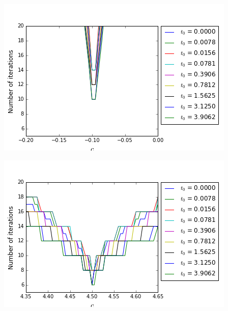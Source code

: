 \begin{minipage}{.5\linewidth}
\begin{center}
	\includegraphics[scale=.4]{figures/FinalFigures/NiterxCoefVarT0FinalVersionNDetail2.png}
\end{center}
\end{minipage}
\begin{minipage}{.5\linewidth}
\begin{center}
	\includegraphics[scale=.4]{figures/FinalFigures/NiterxCoefVarT0FinalVersionPDetail.png}
\end{center}
\end{minipage}
